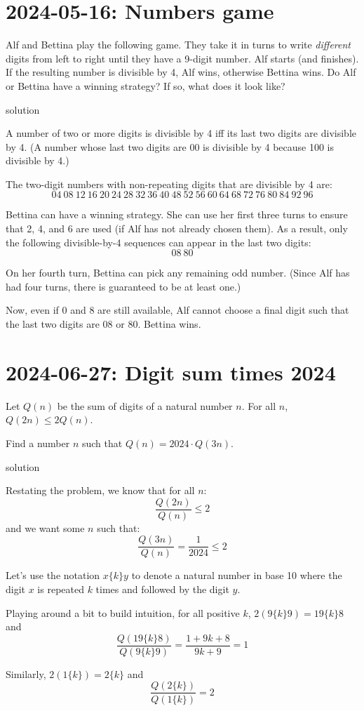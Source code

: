 \documentclass[11pt, oneside]{amsart}
\newcommand{\problem}[2]{\section*{#1: #2}}
\newcommand{\solution}[0]{{\sc solution}}
\begin{document}
\newpage
\problem{2024-05-16}{Numbers game}

Alf and Bettina play the following game. They take it in turns to write {\em different} digits
from left to right until they have a 9-digit number. Alf starts (and finishes). If the resulting number is divisible by 4, Alf wins, otherwise Bettina wins.
Do Alf or Bettina have a winning strategy? If so, what does it look like?

\solution

A number of two or more digits is divisible by 4 iff its last two digits
are divisible by 4. (A number whose last two digits are $00$ is divisible by
4 because 100 is divisible by 4.)

The two-digit numbers with non-repeating digits that are divisible by 4 are:
\[ 04~08~12~16~20~24~28~32~36~40~48~52~56~60~64~68~72~76~80~84~92~96 \]

Bettina can have a winning strategy. She can use her first three turns
to ensure that 2, 4, and 6 are used (if Alf has not already chosen
them). As a result, only the following divisible-by-4 sequences can appear
in the last two digits:
\[ 08~80 \]

On her fourth turn, Bettina can pick any remaining odd number. (Since Alf
has had four turns, there is guaranteed to be at least one.)

Now, even if 0 and 8 are still available, Alf cannot choose a final digit
such that the last two digits are 08 or 80. Bettina wins.

\newpage
\problem{2024-06-27}{Digit sum times 2024}

Let $Q(n)$ be the sum of digits of a natural number $n$. For all $n$, $Q(2n) \leq 2Q(n)$.

Find a number $n$ such that $Q(n) = 2024 \cdot Q(3n)$.

\solution

Restating the problem, we know that for all $n$:
\[ \frac{Q(2n)}{Q(n)} \leq 2 \]
and we want some $n$ such that:
\[ \frac{Q(3n)}{Q(n)} = \frac{1}{2024} \leq 2 \]

Let's use the notation $x\{k\}y$ to denote a natural number in base 10 where the digit $x$ is repeated $k$ times
and followed by the digit $y$.

Playing around a bit to build intuition, for all positive $k$, $2(9\{k\}9) = 19\{k\}8$ and
\[ \frac{Q(19\{k\}8)}{Q(9\{k\}9)} = \frac{1+9k+8}{9k+9} = 1\]

Similarly, $2(1\{k\}) = 2\{k\}$ and
\[ \frac{Q(2\{k\})}{Q(1\{k\})} = 2\]
\end{document}
